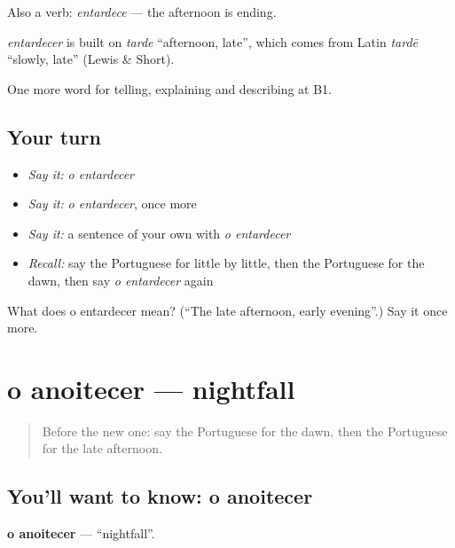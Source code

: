 Also a verb: \emph{entardece} — the afternoon is ending.

\begin{cousinweb}
\emph{entardecer} is built on \emph{tarde} \textquotedblleft{}afternoon, late\textquotedblright{}, which comes from Latin \emph{tardē} \textquotedblleft{}slowly, late\textquotedblright{} (Lewis \& Short).
\end{cousinweb}

\begin{grammarlens}[title={What you've built}]
One more word for telling, explaining and describing at B1.
\end{grammarlens}

\subsection*{Your turn}
\begin{itemize}
\raggedright
  \item \emph{Say it:} \emph{o entardecer}
  \item \emph{Say it:} \emph{o entardecer}, once more
  \item \emph{Say it:} a sentence of your own with \emph{o entardecer}
  \item \emph{Recall:} say the Portuguese for little by little, then the Portuguese for the dawn, then say \emph{o entardecer} again
\end{itemize}

\begin{tcolorbox}[breakable,colback=teal!4,colframe=teal!35!black,title={Before you move on}]
What does o entardecer mean? (\textquotedblleft{}The late afternoon, early evening\textquotedblright{}.) Say it once more.
\end{tcolorbox}
\section[o anoitecer]{o anoitecer — nightfall}

\label{lesson:PT-C275-anoitecer}



\begin{quote}
Before the new one: say the Portuguese for the dawn, then the Portuguese for the late afternoon.
\end{quote}

\subsection*{You'll want to know: o anoitecer}
\textbf{o anoitecer} — \textquotedblleft{}nightfall\textquotedblright{}.

